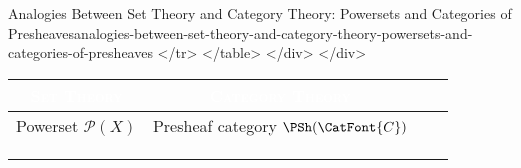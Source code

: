 \begin{remark}{Analogies Between Set Theory and Category Theory: Powersets and Categories of Presheaves}{analogies-between-set-theory-and-category-theory-powersets-and-categories-of-presheaves}
          </tr>
        </table>
      </div>
    </div>
    \begingroup%
    \setlength\cellspacetoplimit{3pt}
    \setlength\cellspacebottomlimit{3pt}
    \renewcommand{\arraystretch}{1.2}
    \begin{center}
        \begin{tabular}{|Sc|Sc|}\hline{}
            \textcolor{white}{\textbf{\textsc{Set Theory}}}                                                                                                                                    & \textcolor{white}{\textbf{\textsc{Category Theory}}}                                                                                                   \\\hline{}
            Powerset $\mathcal{P}(X)$                                                                                                                                                          & Presheaf category $\PSh(\CatFont{C})$                                                                                                         \\
                                                                                                                                                         &                                                                                                                 \\
                                                                                        &                                                     \\
                                                                                        &                                                     \\

\end{tabular}
\end{center}
\end{remark}
